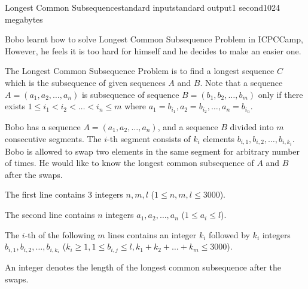 \begin{problem}{Longest Common Subsequence}{standard input}{standard output}{1 second}{1024 megabytes}

Bobo learnt how to solve Longest Common Subsequence Problem in ICPCCamp, 
However, he feels it is too hard for himself and he decides to make an easier one.

The Longest Common Subsequence Problem is to find a longest sequence $C$ which is the subsequence of given sequences $A$ and $B$.
Note that a sequence $A = (a_1, a_2, \dots, a_n)$ is subsequence of sequence $B = (b_1, b_2, \dots, b_m)$ only if there exists $1 \leq i_1 < i_2 < \dots < i_n \leq m$ where $a_1 = b_{i_1}, a_2 = b_{i_2}, \dots, a_n = b_{i_n}$. 

Bobo has a sequence $A = (a_1, a_2, \dots, a_n)$, and a sequence $B$ divided into $m$ consecutive segments.
The $i$-th segment consists of $k_i$ elements $b_{i, 1}, b_{i, 2}, \dots, b_{i, k_i}$.
Bobo is allowed to swap two elements in the same segment for arbitrary number of times.
He would like to know the longest common subsequence of $A$ and $B$ after the swaps.

\InputFile
The first line contains $3$ integers $n, m, l$ ($1 \leq n, m, l \leq 3000$). 

The second line contains $n$ integers $a_1, a_2, \dots, a_n$ ($1 \leq a_i \leq l$). 

The $i$-th of the following $m$ lines contains an integer $k_i$ followed by $k_i$ integers $b_{i, 1}, b_{i, 2}, \dots, b_{i, k_i}$ ($k_i \geq 1, 1 \leq b_{i, j} \leq l, k_1 + k_2 + \dots + k_m \leq 3000$). 

\OutputFile
An integer denotes the length of the longest common subsequence after the swaps.

\Examples

\begin{example}
%
%
\end{example}

\end{problem}

